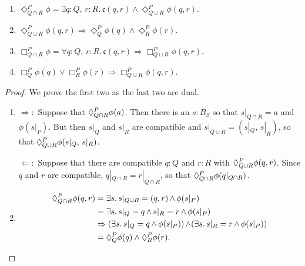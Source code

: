 \begin{claim}
\begin{enumerate}
    \item $\Diamond^P_{Q \cap R}\phi = \exists q : Q,\, r : R.\, \mathfrak{c}(q,r) \wedge \Diamond^P_{Q \cup R}\phi(q, r)$.\bigskip
    \item $\Diamond^P_{Q \cup R} \phi(q, r) \Rightarrow \Diamond^P_Q \phi(q) \wedge \Diamond^P_R \phi(r)$.\bigskip
    \item $\Box^P_{Q \cap R}\phi = \forall q : Q,\, r : R.\, \mathfrak{c}(q,r) \Rightarrow \Box^P_{Q \cup R}\phi(q, r)$.\bigskip
    \item $\Box^P_Q \phi(q) \vee \Box^P_R \phi(r)  \Rightarrow  \Box^P_{Q \cup R} \phi(q, r)$.
\end{enumerate}
\end{claim}
\begin{proof}
We prove the first two as the last two are dual.
\begin{enumerate}
    \item $\Rightarrow:$ Suppose that $\compat{P}{Q \cap R}\phi(a)$. Then there is an $s : B_S$ so that $s|_{Q \cap R} = a$ and $\phi(s|_P)$. But then $s|_Q$ and $s|_R$ are compatible and $s|_{Q \cup R} = (s|_Q,\, s|_R)$, so that $\compat{P}{Q \cup R}\phi(s|_Q,\, s|_R)$.
    
    $\Leftarrow:$ Suppose that there are compatible $q : Q$ and $r : R$ with $\compat{P}{Q \cup R}\phi(q, r)$. Since $q$ and $r$ are compatible, $q|_{Q \cap R} = r|_{Q \cap R}$, so that $\compat{P}{Q \cap R}\phi(q|_{Q \cap R})$.
    \item 
        \begin{align*}
            \compat{P}{Q \cap R}\phi(q, r) &= \exists s.\, s|_{Q \cup R} = (q, r) \meet \phi(s|_P) \\
                &= \exists s.\, s|_Q = q \meet s|_R = r \meet \phi(s|_P) \\
                &\Rightarrow (\exists s.\, s|_Q = q \meet \phi(s|_P)) \meet (\exists s.\, s|_R = r \meet \phi(s|_P)) \\
                &= \compat{P}{Q}\phi(q) \wedge \compat{P}{R}\phi(r).
        \end{align*}
\end{enumerate}
\end{proof}

